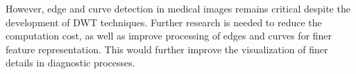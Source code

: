 \documentclass{article}
\begin{document}
However, edge and curve detection in medical images remains critical despite the development of DWT techniques. Further research is needed to reduce the computation cost, as well as improve processing of edges and curves for finer feature representation. This would further improve the visualization of finer details in diagnostic processes. 

\end{document}
